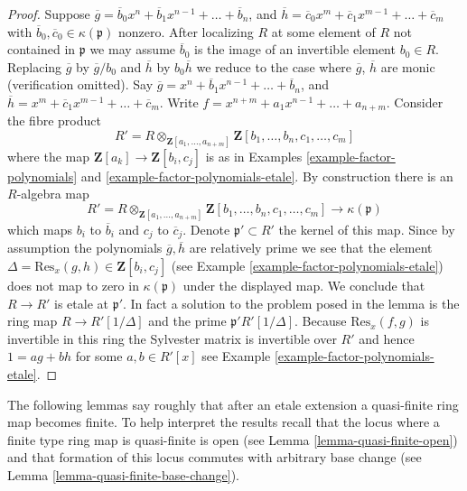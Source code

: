 \begin{proof}
Suppose
$\overline{g} = \overline{b}_0 x^n + \overline{b}_1 x^{n - 1} + \ldots
+ \overline{b}_n$, and
$\overline{h} = \overline{c}_0 x^m + \overline{c}_1 x^{m - 1} + \ldots
+ \overline{c}_m$ with $\overline{b}_0, \overline{c}_0 \in \kappa(\mathfrak p)$
nonzero. After localizing $R$ at some element of $R$ not contained in
$\mathfrak p$ we may assume $\overline{b}_0$ is the
image of an invertible element $b_0 \in R$. Replacing
$\overline{g}$ by $\overline{g}/b_0$ and
$\overline{h}$ by $b_0\overline{h}$ we reduce to the case where
$\overline{g}$, $\overline{h}$ are monic (verification omitted).
Say $\overline{g} = x^n + \overline{b}_1 x^{n - 1} + \ldots + \overline{b}_n$,
and $\overline{h} = x^m + \overline{c}_1 x^{m - 1} + \ldots + \overline{c}_m$.
Write $f = x^{n + m} + a_1 x^{n - 1} + \ldots + a_{n + m}$.
Consider the fibre product
$$
R' = R \otimes_{\mathbf{Z}[a_1, \ldots, a_{n + m}]}
\mathbf{Z}[b_1, \ldots, b_n, c_1, \ldots, c_m]
$$
where the map $\mathbf{Z}[a_k] \to \mathbf{Z}[b_i, c_j]$
is as in Examples \ref{example-factor-polynomials} and
\ref{example-factor-polynomials-etale}. By construction there
is an $R$-algebra map
$$
R' = R \otimes_{\mathbf{Z}[a_1, \ldots, a_{n + m}]}
\mathbf{Z}[b_1, \ldots, b_n, c_1, \ldots, c_m]
\longrightarrow
\kappa(\mathfrak p)
$$
which maps $b_i$ to $\overline{b}_i$ and $c_j$ to $\overline{c}_j$.
Denote $\mathfrak p' \subset R'$ the kernel of this map.
Since by assumption the polynomials $\overline{g}, \overline{h}$
are relatively prime we see that the element
$\Delta = \text{Res}_x(g, h) \in \mathbf{Z}[b_i, c_j]$
(see Example \ref{example-factor-polynomials-etale})
does not map to zero in $\kappa(\mathfrak p)$ under the displayed map.
We conclude that $R \to R'$ is etale at $\mathfrak p'$.
In fact a solution to the problem posed in the lemma is
the ring map $R \to R'[1/\Delta]$ and the prime
$\mathfrak p' R'[1/\Delta]$. Because $\text{Res}_x(f, g)$ is
invertible in this ring the Sylvester matrix is invertible over
$R'$ and hence $1 = a g +  b h$ for some $a, b \in R'[x]$
see Example \ref{example-factor-polynomials-etale}.
\end{proof}

\noindent
The following lemmas say roughly that after an etale extension
a quasi-finite ring map becomes finite.
To help interpret the results recall that the locus where a
finite type ring map is quasi-finite is open
(see Lemma \ref{lemma-quasi-finite-open}) and that formation of
this locus commutes with arbitrary base change
(see Lemma \ref{lemma-quasi-finite-base-change}).

